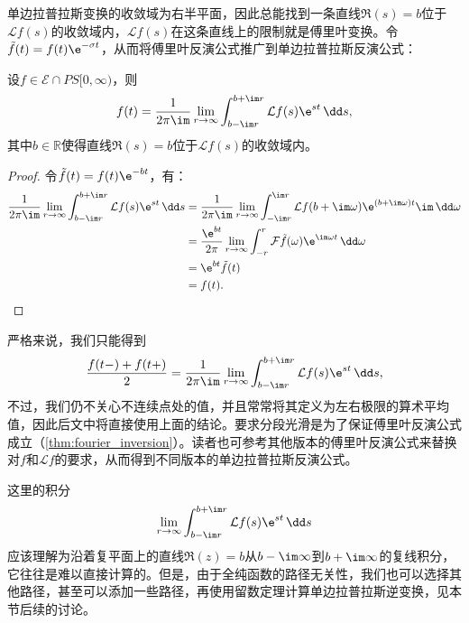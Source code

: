 单边拉普拉斯变换的收敛域为右半平面，因此总能找到一条直线$\Re(s)=b$位于$\mathcal{L}f(s)$的收敛域内，$\mathcal{L}f(s)$在这条直线上的限制就是傅里叶变换。令$\tilde{f}(t)=f(t)\e^{-\sigma t}$，从而将傅里叶反演公式推广到单边拉普拉斯反演公式：
\begin{theorem}[单边拉普拉斯反演公式]
    \label{thm:laplace_inversion}
    设$f\in\mathcal{E}\cap PS[0,\infty)$，则
    \begin{equation}
        f(t)=\frac{1}{2\pi\im}\lim_{r\to\infty}\int_{b-\im r}^{b+\im r}\mathcal{L}f(s)\e^{st}\,\dd s,
    \end{equation}
    其中$b\in\mathbb{R}$使得直线$\Re(s)=b$位于$\mathcal{L}f(s)$的收敛域内。
\end{theorem}
\begin{proof}
    令$\tilde{f}(t)=f(t)\e^{-bt}$，有：
    \begin{align}
        \frac{1}{2\pi\im}\lim_{r\to\infty}\int_{b-\im r}^{b+\im r}\mathcal{L}f(s)\e^{st}\,\dd s&=\frac{1}{2\pi\im}\lim_{r\to\infty}\int_{-\im r}^{\im r}\mathcal{L}f(b+\im\omega)\e^{(b+\im\omega)t}\im\,\dd\omega\nonumber\\
        &=\frac{\e^{bt}}{2\pi}\lim_{r\to\infty}\int_{-r}^{r}\mathcal{F}\tilde{f}(\omega)\e^{\im\omega t}\,\dd\omega\nonumber\\
        &=\e^{bt}\tilde{f}(t)\nonumber\\
        &=f(t).
    \end{align}
\end{proof}
\begin{remark}
    严格来说，我们只能得到
    \begin{equation}
        \frac{f(t-)+f(t+)}{2}=\frac{1}{2\pi\im}\lim_{r\to\infty}\int_{b-\im r}^{b+\im r}\mathcal{L}f(s)\e^{st}\,\dd s,
    \end{equation}
    不过，我们仍不关心不连续点处的值，并且常常将其定义为左右极限的算术平均值，因此后文中将直接使用上面的结论。要求分段光滑是为了保证傅里叶反演公式成立（\cref{thm:fourier_inversion}）。读者也可参考其他版本的傅里叶反演公式来替换对$f$和$\mathcal{L}f$的要求，从而得到不同版本的单边拉普拉斯反演公式。
\end{remark}
\begin{remark}
    这里的积分
    \begin{equation}
        \lim_{r\to\infty}\int_{b-\im r}^{b+\im r}\mathcal{L}f(s)\e^{st}\,\dd s
    \end{equation}
    应该理解为沿着复平面上的直线$\Re(z)=b$从$b-\im\infty$到$b+\im\infty$的复线积分，它往往是难以直接计算的。但是，由于全纯函数的路径无关性，我们也可以选择其他路径，甚至可以添加一些路径，再使用留数定理计算单边拉普拉斯逆变换，见本节后续的讨论。
\end{remark}

